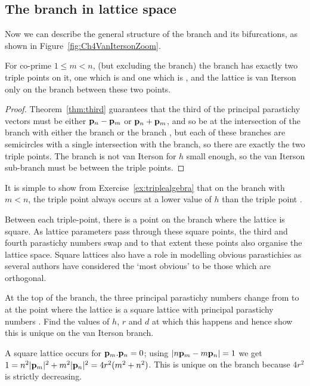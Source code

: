 \subsection{The  branch in lattice space}
Now we can describe the general structure of the  branch and its bifurcations, as shown in Figure~\ref{fig:Ch4VanItersonZoom}.
\begin{theorem}
	For co-prime $1\leq m<n$,  (but excluding the  branch) the  branch has exactly two triple points on it, one which is  and one which is ,  and the lattice is van Iterson only on the branch between these two points.
\end{theorem}
\begin{proof}
	Theorem~\ref{thm:third} guarantees that the third of the principal parastichy vectors must be either ${\mathbf p}_{n}-{\mathbf p}_{m}$  or  ${\mathbf p}_{n}+{\mathbf p}_{m}$, 
	and so be at the intersection of the branch with either the branch   or the branch  , but each of these branches are semicircles with a single intersection with the  branch, so there are exactly the two triple points.  The  branch is not van Iterson for $h$ small enough, so the van Iterson sub-branch must be between the triple points. 
\end{proof}
It is simple to show from Exercise~\ref{ex:triplealgebra} that on the   branch with $m<n$, the triple point  always occurs at a lower value of $h$ than the triple point . 


Between each triple-point, there is a point on the branch where the lattice is square. 
As lattice parameters pass through these square points, the third and fourth parastichy numbers swap and to that extent these points also organise the lattice space. 
Square lattices also have a role in modelling obvious parastichies as several authors have considered the `most obvious' to be those which are orthogonal. 
\begin{jExercise}
	At the top of the  branch, the three principal parastichy numbers change from  to  at the point where the lattice is a square lattice with principal parastichy numbers . Find the values of $h$, $r$ and $d$ at which this happens and hence show this is unique on the van Iterson branch.
\end{jExercise}
\begin{jAnswer}
	A square lattice occurs for ${\mathbf p}_{m}.{\mathbf p}_{n}=0$; using $|n{\mathbf p}_{m}-m{\mathbf p}_{n}|=1$ we get
	$1=n^2|{\mathbf p}_{m}|^2+m^2|{\mathbf p}_{n}|^2= 4 r^2 ( m^2+n^2)$. This is unique on the branch because  $4r^2$ is strictly decreasing.
\end{jAnswer}
\newpage
